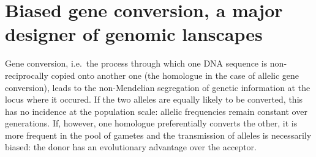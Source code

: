 \begin{savequote}[8cm]



\end{savequote}

\chapter{\label{ch:4-gBGC}Biased gene conversion, a major designer of genomic lanscapes} 

\minitoc{}

%
%
%





Gene conversion, i.e.\ the process through which one DNA sequence is non-reciprocally copied onto another one (the homologue in the case of allelic gene conversion), leads to the non-Mendelian segregation of genetic information at the locus where it occured. 
If the two alleles are equally likely to be converted, this has no incidence at the population scale: allelic frequencies remain constant over generations. 
If, however, one homologue preferentially converts the other, it is more frequent in the pool of gametes and the transmission of alleles is necessarily biased: the donor has an evolutionary advantage over the acceptor.

